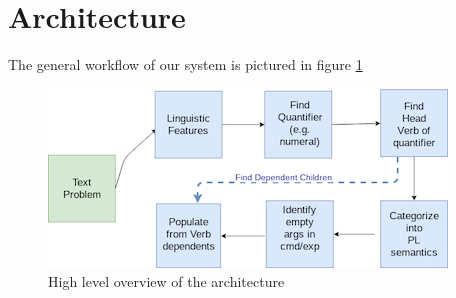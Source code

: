 \section{Architecture}
The general workflow of our system is pictured in figure \ref{fig:workflow}

\begin{figure}[htbp] %
\includegraphics[scale=1]{../images/overview-flowchart.png}
\caption{High level overview of the architecture}
\label{fig:workflow}
\end{figure}